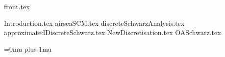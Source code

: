 



\newcommand{\currentlabel}{}
\let\oldlabel\label
\renewcommand{\label}[1]{\oldlabel{#1}\renewcommand{\currentlabel}{#1}}

\newcommand{\currentlabelchapter}{}
\newcommand{\labelchapter}[1]{\label{#1}\renewcommand{\currentlabelchapter}{#1}}


\newcommand{\mySub}[2]{{\noindent\bf#2}\tabto*{#1}}


\sloppy %

{front.tex}

\mainmatter
{Introduction.tex}
{airseaSCM.tex}
{discreteSchwarzAnalysis.tex}
{approximatedDiscreteSchwarz.tex}
{NewDiscretisation.tex}
{OASchwarz.tex}


\backmatter
\clearpage
{}
{}
\Urlmuskip=0mu plus 1mu\relax




